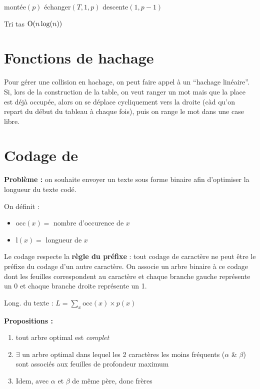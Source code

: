 \documentclass[a4paper, 8pt]{article}
\begin{document}
\begin{multicols*}{3}
\begin{algorithm}[H]
  {
  	montée$(p)$ \;
  }
  {
  	échanger$(T,1,p)$ \;
  	descente$(1,p-1)$ \;
  }
 \caption{Tri tas $\text{O}(n\log(n))$}
\end{algorithm}

\section*{Fonctions de hachage}

Pour gérer une collision en hachage, on peut faire appel à un  \enquote{hachage linéaire}. Si, lors de la construction de la table, on veut ranger un mot mais que la place est déjà occupée, alors on se déplace cycliquement vers la droite (càd qu'on repart du début du tableau à chaque fois), puis on range le mot dans une case libre.

\section*{Codage de }

\textbf{Problème :} on souhaite envoyer un texte sous forme binaire afin d'optimiser la longueur du texte codé.

\newcommand{\occ}{\text{occ}}
\newcommand{\lng}{\text{l}}
On définit :
\begin{itemize}
\item $\occ(x) =$ nombre d'occurence de $x$
\item $\lng(x) =$ longueur de $x$
\end{itemize}

Le codage respecte la \textbf{règle du préfixe} : tout codage de caractère ne peut être le préfixe du codage d'un autre caractère. On associe un arbre binaire à ce codage dont les feuilles correspondent au caractère et chaque branche gauche représente un 0 et chaque branche droite représente un 1.

Long. du texte :
$L = \sum_{x}{\occ(x)\times p(x)}$

\textbf{Propositions :}
\begin{enumerate}
\item tout arbre optimal est \emph{complet}
\item $\exists$ un arbre optimal dans lequel les 2 caractères les moins fréquents ($\alpha$ \& $\beta$) sont associés aux feuilles de profondeur maximum
\item Idem, avec $\alpha$ et $\beta$ de même père, donc frères
\end{enumerate}


\end{multicols*}
\end{document}
